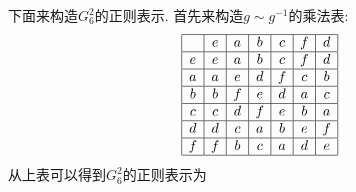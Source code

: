 \documentclass[UTF8]{ctexart}
\begin{document}
下面来构造$G_6^2$的正则表示. 首先来构造$g \sim g^{-1}$的乘法表:
\begin{equation}
  \begin{array}{|c|c|c|c|c|c|c|}
   \hline
     & e & a & b & c & f & d \\
   \hline
   e & e & a & b & c & f & d \\
   \hline
   a & a & e & d & f & c & b \\
   \hline
   b & b & f & e & d & a & c \\
   \hline
   c & c & d & f & e & b & a \\
   \hline
   d & d & c & a & b & e & f \\
   \hline
   f & f & b & c & a & d & e \\
   \hline
  \end{array}
\end{equation}
从上表可以得到$G_6^2$的正则表示为
\end{document}
